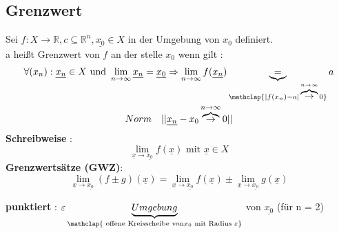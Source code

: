 \subsection{Grenzwert}
\begin{definition}
Sei $f:X \rightarrow \mathbb{R} , c \subseteq \mathbb{R}^n , \underline{x_0} \in X$ in der Umgebung von $x_0$ definiert.\\
a heißt Grenzwert von $f$ an der stelle $x_0$ wenn gilt : 
\begin{gather*}
\forall(x_n): \underline{x_n} \in X \text{ und } \lim_{n \to \infty}{\underline{x_n} = \underline{x_0}} \Rightarrow \lim_{n \to \infty}{f(\underline{x_n})} \underbrace{=}_{\mathclap{|f(x_n)-a| \overbrace{\rightarrow}^{n \to \infty}  0}}  a\\
Norm \quad || \underline{x_n}-{x_0} \overbrace{\rightarrow}^{n \to \infty}  0 ||
\end{gather*}
\textbf{Schreibweise} :
\[ \lim_{\underline{x} \to \underline{x_0}} f(\underline{x}) \text{ mit } \underline{x} \in X \]
\textbf{Grenzwertsätze (GWZ)}:$$ \lim_{\underline{x} \to \underline{x_0}}(f \pm g )(\underline{x}) = \lim_{\underline{x} \to \underline{x_0}}f(\underline{x}) \pm \lim_{\underline{x} \to \underline{x_0}}g(\underline{x}) $$ 
\end{definition}
\textbf{punktiert} :
$\varepsilon \underbrace{ Umgebung }_{\mathclap{ \text{ offene Kreisscheibe von} x_0 \text{  mit Radius } \varepsilon}}$ von $\underline{x_0}$ (für n = 2)

